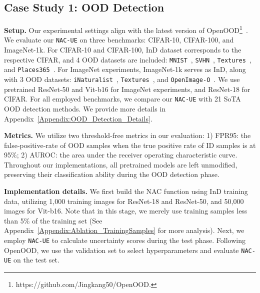 \documentclass{article} \usepackage{iclr2024_conference,times}
\newcommand{\bfstart}[1]{\noindent\textbf{#1.}}
\begin{document}
\subsection{Case Study 1: OOD Detection}
\vspace{-2mm}
\label{Sec:Exp_OOD_Detection}
\bfstart{Setup} Our experimental settings align with the latest version of OpenOOD\footnote{https://github.com/Jingkang50/OpenOOD.}~\citep{Setup:OpenOOD,Setup:OpenOODv1.5}. 
We evaluate our \texttt{NAC-UE} on three benchmarks: CIFAR-10, CIFAR-100, and ImageNet-1k.
For CIFAR-10 and CIFAR-100, InD dataset corresponds to the respective CIFAR, and 4 OOD datasets are included: \texttt{MNIST}~\citep{OOD_Dataset:MNIST}, \texttt{SVHN}~\citep{OOD_Dataset:SVHN}, \texttt{Textures}~\citep{OOD_Dataset:Textures}, and \texttt{Places365}~\citep{OOD_Dataset:Places}.
For ImageNet experiments,  ImageNet-1k serves as InD, along with 3 OOD datasets: \texttt{iNaturalist}~\citep{OOD_Dataset:iNaturalist}, \texttt{Textures}~\citep{OOD_Dataset:Textures}, and \texttt{OpenImage-O}~\citep{OOD_Detect:ViM}. We use pretrained ResNet-50 and Vit-b16 for ImageNet experiments, and ResNet-18 for CIFAR. 
For all employed benchmarks, we compare our \texttt{NAC-UE} with 21 SoTA OOD detection methods. We provide more details in Appendix~\ref{Appendix:OOD_Detection_Details}.








\bfstart{Metrics} 
We utilize two threshold-free metrics in our evaluation: 1) FPR95: the false-positive-rate of OOD samples when the true positive rate of ID samples is at 95\%; 2) AUROC: the area under the receiver operating characteristic curve.
Throughout our implementations, all pretrained models are left unmodified, preserving their classification ability during the OOD detection phase.

\bfstart{Implementation details} 
We first build the NAC function using InD training data, utilizing 1,000 training images for ResNet-18 and ResNet-50, and 50,000 images for Vit-b16. 
Note that in this stage, we merely use training samples less than 5\% of the training set (See Appendix~\ref{Appendix:Ablation_TrainingSamples} for more analysis).
Next, we employ \texttt{NAC-UE} to calculate uncertainty scores during the test phase.
Following OpenOOD, we use the validation set to select hyperparameters and evaluate \texttt{NAC-UE} on the test set.
\end{document}
